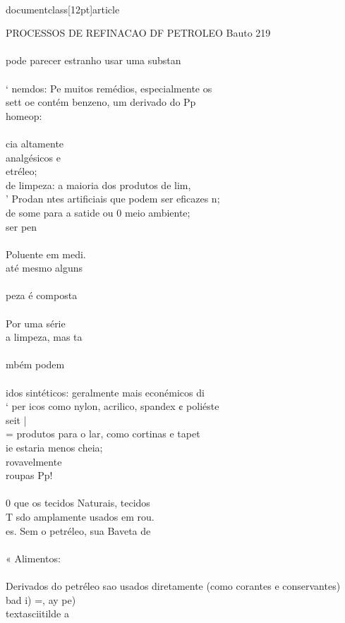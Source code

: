 \\documentclass[12pt]{article}
\begin{document}
PROCESSOS DE REFINACAO DF PETROLEO Bauto 219\\
\\
pode parecer estranho usar uma substan\\
\\
‘ nemdos: Pe muitos remédios, especialmente os\\
sett oe contém benzeno, um derivado do Pp\\
homeop:\\
\\
cia altamente\\
analgésicos e\\
etréleo;\\
de limpeza: a maioria dos produtos de lim,\\
’ Prodan ntes artificiais que podem ser eficazes n;\\
de some para a satide ou 0 meio ambiente;\\
ser pen\\
\\
Poluente em medi.\\
até mesmo alguns\\
\\
peza é composta\\
\\
Por uma série\\
a limpeza, mas ta\\
\\
mbém podem\\
\\
idos sintéticos: geralmente mais econémicos di\\
‘ per icos como nylon, acrilico, spandex ¢ poliéste\\
seit |\\
= produtos para o lar, como cortinas e tapet\\
ie estaria menos cheia;\\
rovavelmente\\
roupas Pp!\\
\\
0 que os tecidos Naturais, tecidos\\
T sdo amplamente usados em rou.\\
es. Sem o petréleo, sua Baveta de\\
\\
« Alimentos:\\
\\
Derivados do petréleo sao usados diretamente (como corantes e conservantes)\\
bad i) =, ay pe) \\textasciitilde{} a\\
\end{document}
